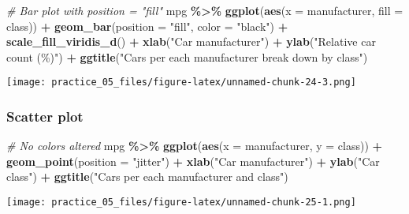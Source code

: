 \documentclass[
]{article}
\newenvironment{Shaded}{\begin{snugshade}}{\end{snugshade}}
\newcommand{\AttributeTok}[1]{\textcolor[rgb]{0.13,0.29,0.53}{#1}}
\newcommand{\CommentTok}[1]{\textcolor[rgb]{0.56,0.35,0.01}{\textit{#1}}}
\newcommand{\FunctionTok}[1]{\textcolor[rgb]{0.13,0.29,0.53}{\textbf{#1}}}
\newcommand{\NormalTok}[1]{#1}
\newcommand{\SpecialCharTok}[1]{\textcolor[rgb]{0.81,0.36,0.00}{\textbf{#1}}}
\newcommand{\StringTok}[1]{\textcolor[rgb]{0.31,0.60,0.02}{#1}}
\begin{document}
\begin{Shaded}
\begin{Highlighting}[]
\CommentTok{\# Bar plot with position = "fill"}
\NormalTok{mpg }\SpecialCharTok{\%\textgreater{}\%} 
  \FunctionTok{ggplot}\NormalTok{(}\FunctionTok{aes}\NormalTok{(}\AttributeTok{x =}\NormalTok{ manufacturer,}
             \AttributeTok{fill =}\NormalTok{ class)) }\SpecialCharTok{+}
  \FunctionTok{geom\_bar}\NormalTok{(}\AttributeTok{position =} \StringTok{"fill"}\NormalTok{,}
           \AttributeTok{color =} \StringTok{"black"}\NormalTok{) }\SpecialCharTok{+}  
  \FunctionTok{scale\_fill\_viridis\_d}\NormalTok{() }\SpecialCharTok{+}
  \FunctionTok{xlab}\NormalTok{(}\StringTok{"Car manufacturer"}\NormalTok{) }\SpecialCharTok{+}
  \FunctionTok{ylab}\NormalTok{(}\StringTok{"Relative car count (\%)"}\NormalTok{) }\SpecialCharTok{+}
  \FunctionTok{ggtitle}\NormalTok{(}\StringTok{"Cars per each manufacturer break down by class"}\NormalTok{)}
\end{Highlighting}
\end{Shaded}

\texttt{[image: practice\_05\_files/figure-latex/unnamed-chunk-24-3.png]}

\subsubsection{Scatter plot}\label{scatter-plot-1}

\begin{Shaded}
\begin{Highlighting}[]
\CommentTok{\#   No colors altered}
\NormalTok{mpg }\SpecialCharTok{\%\textgreater{}\%} 
  \FunctionTok{ggplot}\NormalTok{(}\FunctionTok{aes}\NormalTok{(}\AttributeTok{x =}\NormalTok{ manufacturer,}
             \AttributeTok{y =}\NormalTok{ class)) }\SpecialCharTok{+}
  \FunctionTok{geom\_point}\NormalTok{(}\AttributeTok{position =} \StringTok{"jitter"}\NormalTok{) }\SpecialCharTok{+}  
  \FunctionTok{xlab}\NormalTok{(}\StringTok{"Car manufacturer"}\NormalTok{) }\SpecialCharTok{+}
  \FunctionTok{ylab}\NormalTok{(}\StringTok{"Car class"}\NormalTok{) }\SpecialCharTok{+}
  \FunctionTok{ggtitle}\NormalTok{(}\StringTok{"Cars per each manufacturer and class"}\NormalTok{)}
\end{Highlighting}
\end{Shaded}

\texttt{[image: practice\_05\_files/figure-latex/unnamed-chunk-25-1.png]}
\end{document}
